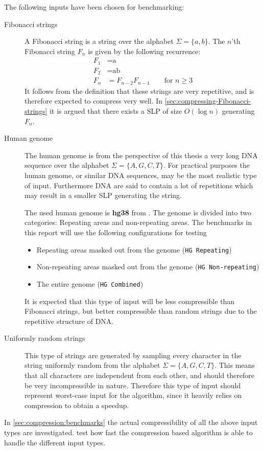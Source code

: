\documentclass[twoside,11pt,openright]{report}
\begin{document}
The following inputs have been chosen for benchmarking:
\begin{description}
  \item[Fibonacci strings] A Fibonacci string is a string over the alphabet $\Sigma = \{a,b\}$. The $n$'th Fibonacci string $F_n$ is given by the following recurrence:
    \begin{align*}
      F_1 &= \text{a} \\
      F_2 &= \text{ab} \\
      F_{n} &= F_{n - 2} F_{n - 1} \quad\quad \text{for } n \geq 3
    \end{align*}
    It follows from the definition that these strings are very repetitive, and is therefore expected to compress very well. In \cref{sec:compressing-Fibonacci-strings} it is argued that there exists a SLP of size $O(\log{n})$ generating $F_n$.
  \item[Human genome] The human genome is from the perspective of this thesis a very long DNA sequence over the alphabet $\Sigma = \{A,G,C,T\}$. For practical purposes the human genome, or similar DNA sequences, may be the most realistic type of input. Furthermore DNA are said to contain a lot of repetitions which may result in a smaller SLP generating the string.

   The used human genome is \textbf{hg38} from \cite{HumanGenome}. The genome is divided into two categories: Repeating areas and non-repeating areas. The benchmarks in this report will use the following configurations for testing
  \begin{itemize}
    \item Repeating areas masked out from the genome (\texttt{HG Repeating})
    \item Non-repeating areas masked out from the genome (\texttt{HG Non-repeating})
    \item The entire genome (\texttt{HG Combined})
  \end{itemize}
  It is expected that this type of input will be less compressible than Fibonacci strings, but better compressible than random strings due to the repetitive structure of DNA.

  \item[Uniformly random strings] This type of strings are generated by sampling every character in the string uniformly random from the alphabet $\Sigma = \{A,G,C,T\}$. This means that all characters are independent from each other, and should therefore be very incompressible in nature. Therefore this type of input should represent worst-case input for the algorithm, since it heavily relies on compression to obtain a speedup.
\end{description}
In \cref{sec:compression:benchmarks} the actual compressibility of all the above input types are investigated.  test how fast the compression based algorithm is able to handle the different input types.
\end{document}
